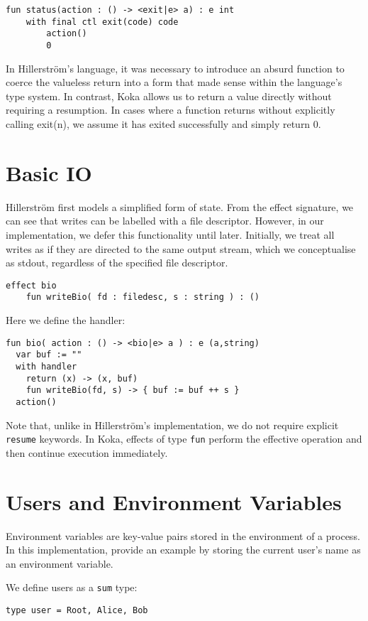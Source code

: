 \documentclass[logo,bsc,singlespacing,parskip]{infthesis}
\begin{document}
\begin{lstlisting}
fun status(action : () -> <exit|e> a) : e int
    with final ctl exit(code) code
        action()
        0
\end{lstlisting}
In Hillerström’s language, it was necessary to introduce an absurd function to coerce the valueless return into a form that made sense within the language’s type system. In contrast, Koka allows us to return a value directly without requiring a resumption. In cases where a function returns without explicitly calling exit(n), we assume it has exited successfully and simply return 0.

\section{Basic IO}
Hillerström first models a simplified form of state. From the effect signature, we can see that writes can be labelled with a file descriptor. However, in our implementation, we defer this functionality until later. Initially, we treat all writes as if they are directed to the same output stream, which we conceptualise as stdout, regardless of the specified file descriptor.

\begin{lstlisting}
effect bio
    fun writeBio( fd : filedesc, s : string ) : ()
\end{lstlisting}
\vspace{1em}
Here we define the handler:

\begin{lstlisting}
fun bio( action : () -> <bio|e> a ) : e (a,string)
  var buf := ""    
  with handler
    return (x) -> (x, buf)
    fun writeBio(fd, s) -> { buf := buf ++ s }
  action()
\end{lstlisting}

Note that, unlike in Hillerström’s implementation, we do not require explicit \lstinline{resume} keywords. In Koka, effects of type \lstinline{fun} perform the effective operation and then continue execution immediately.

\section{Users and Environment Variables}
Environment variables are key-value pairs stored in the environment of a process. In this implementation, provide an example by storing the current user's name as an environment variable.

We define users as a \lstinline{sum} type:
\begin{lstlisting}
type user = Root, Alice, Bob
\end{lstlisting}
\end{document}
